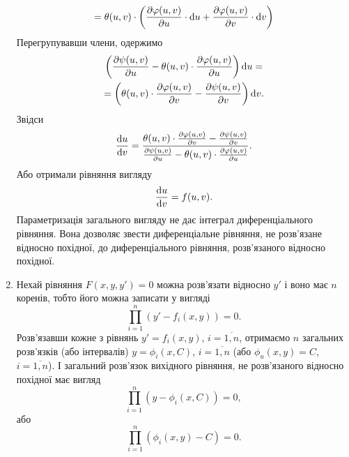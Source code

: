 \begin{enumerate}
\begin{multline*}
		= \theta(u,v) \cdot \left( \frac{\partial \varphi(u,v)}{\partial u} \cdot \mathop{}\!\mathrm{d} u + \frac{\partial \varphi(u, v)}{\partial v} \cdot \mathop{}\!\mathrm{d} v\right)
	\end{multline*}
	Перегрупувавши члени, одержимо
	\begin{multline*}
		\left( \frac{\partial \psi(u,v)}{\partial u} - \theta(u, v) \cdot \frac{\partial \varphi(u,v)}{\partial u} \right) \mathop{}\!\mathrm{d} u = \\
		= \left( \theta(u,v) \cdot \frac{\partial \varphi(u, v)}{\partial v} - \frac{\partial \psi(u, v)}{\partial v} \right) \mathop{}\!\mathrm{d} v.
	\end{multline*}
	Звідси
	\begin{equation*}
		\frac{\mathop{}\!\mathrm{d} u}{\mathop{}\!\mathrm{d} v} = \frac{\theta(u,v) \cdot \frac{\partial \varphi(u, v)}{\partial v} - \frac{\partial \psi(u, v)}{\partial v}}{\frac{\partial \psi(u,v)}{\partial u} - \theta(u, v) \cdot \frac{\partial \varphi(u,v)}{\partial u}}.
	\end{equation*}
	Або отримали рівняння вигляду
	\begin{equation*}
		\frac{\mathop{}\!\mathrm{d} u}{\mathop{}\!\mathrm{d} v} = f(u, v).
	\end{equation*}
	Параметризація загального вигляду не дає інтеграл диференціального рівняння. Вона дозволяє звести диференціальне рівняння, не роз\-в'яз\-а\-не відносно похідної, до диференціального рівняння, роз\-в'яз\-а\-но\-го відносно похідної.
	\item Нехай рівняння $F(x, y, y') = 0$ можна розв’язати відносно $y'$ і воно має $n$ коренів, тобто його  можна записати у вигляді  
	\begin{equation*}
		\prod_{i=1}^n (y' - f_i(x, y)) = 0.
	\end{equation*}
	Розв’язавши кожне з рівнянь $y' = f_i(x, y)$, $i=\overline{1,n}$, отримаємо $n$ загальних розв’язків (або інтервалів) $y = \phi_i(x, C)$, $i=\overline{1,n}$ (або $\phi_u(x,y)=C$, $i=\overline{1,n}$). І загальний розв’язок вихідного рівняння, не розв’язаного відносно похідної має вигляд
	\begin{equation*}
		\prod_{i=1}^n (y - \phi_i(x, C)) = 0,
	\end{equation*}
	або
	\begin{equation*}
		\prod_{i=1}^n (\phi_i(x, y) - C) = 0.
	\end{equation*}
\end{enumerate}
